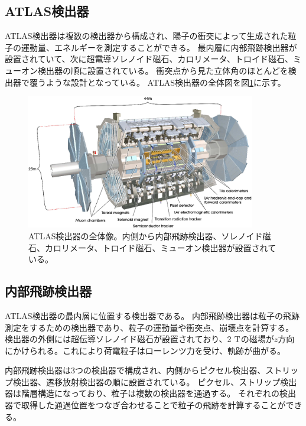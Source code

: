 \subsection{ATLAS検出器}
ATLAS検出器は複数の検出器から構成され、陽子の衝突によって生成された粒子の運動量、エネルギーを測定することができる。
最内層に内部飛跡検出器が設置されていて、次に超電導ソレノイド磁石、カロリメータ、トロイド磁石、ミューオン検出器の順に設置されている。
衝突点から見た立体角のほとんどを検出器で覆うような設計となっている。
ATLAS検出器の全体図を図\ref{atlas_detector}に示す。

\begin{figure}[bpt]\centering
\includegraphics[width=10cm]{./atlas_detector.png}
\caption[ATLAS検出器の全体像]{ATLAS検出器の全体像\cite{1-2}。内側から内部飛跡検出器、ソレノイド磁石、カロリメータ、トロイド磁石、ミューオン検出器が設置されている。}
\label{atlas_detector}
\end{figure}


\clearpage
\subsection{内部飛跡検出器}
ATLAS検出器の最内層に位置する検出器である。
内部飛跡検出器は粒子の飛跡測定をするための検出器であり、粒子の運動量や衝突点、崩壊点を計算する。
検出器の外側には超伝導ソレノイド磁石が設置されており、2 $\rm{T}$の磁場が$z$方向にかけられる。これにより荷電粒子はローレンツ力を受け、軌跡が曲がる。

内部飛跡検出器は3つの検出器で構成され、内側からピクセル検出器、ストリップ検出器、遷移放射検出器の順に設置されている。
ピクセル、ストリップ検出器は階層構造になっており、粒子は複数の検出器を通過する。
それぞれの検出器で取得した通過位置をつなぎ合わせることで粒子の飛跡を計算することができる。

